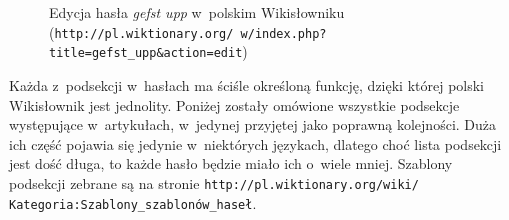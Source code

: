 \documentclass{pracamgr}
\newenvironment{illustration}[0]{
	\begin{figure}[ht]
	\begin{center}
}{
	\end{center}
	\end{figure}
}
\begin{document}
\begin{illustration}
	\caption{Edycja hasła \emph{gefst upp} w~polskim Wikisłowniku (\texttt{http://pl.wiktionary.org/ w/index.php?title=gefst\_upp\&action=edit})}
	\label{fig:plhaslo-edit}
\end{illustration}

Każda z~podsekcji w~hasłach ma ściśle określoną funkcję, dzięki której polski Wikisłownik jest jednolity. Poniżej zostały omówione wszystkie podsekcje występujące w~artykułach, w~jedynej przyjętej jako poprawną kolejności. Duża ich część pojawia się jedynie w~niektórych językach, dlatego choć lista podsekcji jest dość długa, to każde hasło będzie miało ich o~wiele mniej. Szablony podsekcji zebrane są na stronie \texttt{http://pl.wiktionary.org/wiki/ Kategoria:Szablony\_szablonów\_haseł}.
\end{document}
